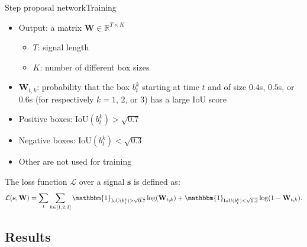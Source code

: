 \documentclass[8pt,t,aspectratio=1610]{beamer}
\newcommand{\bfs}{\mathbf{s}}
\newcommand{\bbmind}{\mathbbm{1}}
\newcommand{\iou}{\mathrm{IoU}}
\begin{document}
\begin{frame}{Step proposal network}{Training}
\begin{itemize}
    \item Output: a matrix $\mathbf{W} \in \mathbb{R}^{T \times K}$
    \begin{itemize}
        \item $T$: signal length
        \item $K$: number of different box sizes
    \end{itemize}

    \item $\mathbf{W}_{t,k}$: probability that the box $b_t^k$ starting at time $t$ and of size $0.4$s, $0.5$s, or $0.6$s (for respectively $k=1$, $2$, or $3$) has a large $\iou$ score
    \item Positive boxes: $\iou(b_t^{k}) > \sqrt{0.7}$
    \item Negative boxes: $\iou(b_t^{k}) < \sqrt{0.3}$
    \item Other are not used for training
\end{itemize}

\vspace{0.8cm}

The loss function $\mathcal{L}$ over a signal $\bfs$ is defined as:
\begin{equation*}\label{eq: loss training CNN}
\mathcal{L}(\bfs, \mathbf{W}) = \sum_{t} \sum_{k \in \left[1, 2, 3 \right]} \bbmind_{ \iou(b_t^{k})> \sqrt{0.7} } \log(\mathbf{W}_{t,k}) + \bbmind_{ \iou(b_t^{k})< \sqrt{0.3} } \log(1-\mathbf{W}_{t,k}). 
\end{equation*}
\end{frame}

\subsection{Results}

\end{document}
